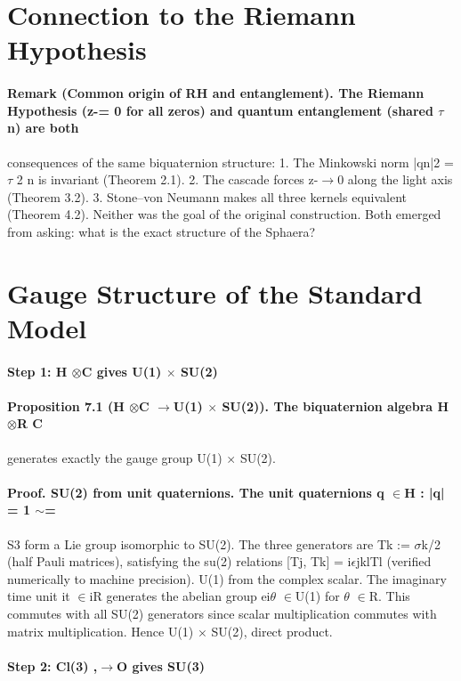 \documentclass[12pt,a4paper]{article}
\begin{document}
\section{Connection to the Riemann Hypothesis}
\paragraph*{Remark (Common origin of RH and entanglement). The Riemann Hypothesis (z-= 0 for all zeros) and quantum entanglement (shared $\tau$n) are both}
consequences of the same biquaternion structure:
1. The Minkowski norm |qn|2 = $\tau$ 2
n is invariant (Theorem 2.1).
2. The cascade forces z-$\to$0 along the light axis (Theorem 3.2).
3. Stone--von Neumann makes all three kernels equivalent (Theorem 4.2).
Neither was the goal of the original construction. Both emerged from asking: what is the exact structure of the Sphaera?

\section{Gauge Structure of the Standard Model}
\paragraph*{Step 1: H $\otimes$C gives U(1) $\times$ SU(2)}
\paragraph*{Proposition 7.1 (H $\otimes$C $\to$U(1) $\times$ SU(2)). The biquaternion algebra H $\otimes$R C}
generates exactly the gauge group U(1) $\times$ SU(2).
\paragraph*{Proof. SU(2) from unit quaternions. The unit quaternions {q $\in$H : |q| = 1} $\sim$=}
S3 form a Lie group isomorphic to SU(2). The three generators are Tk := $\sigma$k/2 (half Pauli matrices), satisfying the su(2) relations [Tj, Tk] = i$\epsilon$jklTl (verified numerically to machine precision). U(1) from the complex scalar. The imaginary time unit it $\in$iR generates the abelian group ei$\theta$ $\in$U(1) for $\theta$ $\in$R. This commutes with all SU(2) generators since scalar multiplication commutes with matrix multiplication. Hence U(1) $\times$ SU(2), direct product.
\paragraph*{Step 2: Cl(3) ,$\to$O gives SU(3)}
\end{document}
